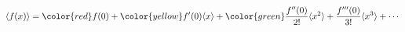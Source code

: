 \documentclass[preview]{standalone}
\begin{document}
\begin{align*}
\langle f(x) \rangle = {\color{red} f(0)} + {\color{yellow} f'(0)}\langle x \rangle + {\color{green} \frac{f''(0)}{2!}}\langle x^2 \rangle + \frac{f'''(0)}{3!}\langle x^3 \rangle + \cdots
\end{align*}
\end{document}
